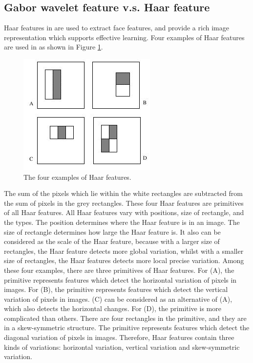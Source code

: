 \subsection{Gabor wavelet feature v.s. Haar feature}
Haar features in \cite{Viola2001} are used to extract face features, and provide a rich image representation which supports effective learning. Four examples of Haar features are used in \cite{Viola2004} as shown in \mbox{Figure} \ref{fig:haarfeatures}. 
\begin{figure}[ht]
 \begin{center}
  \includegraphics[width=0.5\columnwidth]{ch5/figures/haarfeatures.jpg}
\caption{The four examples of Haar features. \cite{Viola2001}}
\label{fig:haarfeatures}
 \end{center}
\end{figure} 
The sum of the pixels which lie within the white rectangles are subtracted from the sum of pixels in the grey rectangles. These four Haar features are primitives of all Haar features. All Haar features vary with positions, size of rectangle, and the types. The position determines where the Haar feature is in an image. The size of rectangle determines how large the Haar feature is. It also can be considered as the scale of the Haar feature, because with a larger size of rectangles, the Haar feature detects more global variation, whilst with a smaller size of rectangles, the Haar features detects more local precise variation. Among these four examples, there are three primitives of Haar features. For (A), the primitive represents features which detect the horizontal variation of pixels in images. For (B), the primitive represents features which detect the vertical variation of pixels in images. (C) can be considered as an alternative of (A), which also detects the horizontal changes. For (D), the primitive is more complicated than others. There are four rectangles in the primitive, and they are in a skew-symmetric structure. The primitive represents features which detect the diagonal variation of pixels in images. Therefore, Haar features contain three kinds of variations: horizontal variation, vertical variation and skew-symmetric variation.

